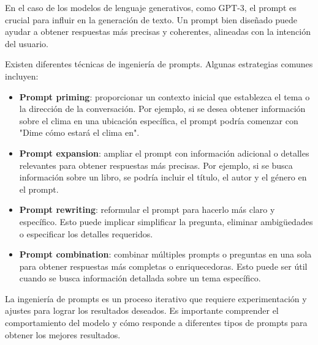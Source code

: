 En el caso de los modelos de lenguaje generativos, como GPT-3, el prompt es crucial para influir en la generación de texto. Un prompt bien diseñado puede ayudar a obtener respuestas más precisas y coherentes, alineadas con la intención del usuario.

Existen diferentes técnicas de ingeniería de prompts. Algunas estrategias comunes incluyen:
\begin{itemize}
\item \textbf{Prompt priming}: proporcionar un contexto inicial que establezca el tema o la dirección de la conversación. Por ejemplo, si se desea obtener información sobre el clima en una ubicación específica, el prompt podría comenzar con "Dime cómo estará el clima en".
\item \textbf{Prompt expansion}: ampliar el prompt con información adicional o detalles relevantes para obtener respuestas más precisas. Por ejemplo, si se busca información sobre un libro, se podría incluir el título, el autor y el género en el prompt.
\item \textbf{Prompt rewriting}: reformular el prompt para hacerlo más claro y específico. Esto puede implicar simplificar la pregunta, eliminar ambigüedades o especificar los detalles requeridos.
\item \textbf{Prompt combination}: combinar múltiples prompts o preguntas en una sola para obtener respuestas más completas o enriquecedoras. Esto puede ser útil cuando se busca información detallada sobre un tema específico.
\end{itemize}

La ingeniería de prompts es un proceso iterativo que requiere experimentación y ajustes para lograr los resultados deseados. Es importante comprender el comportamiento del modelo y cómo responde a diferentes tipos de prompts para obtener los mejores resultados.

